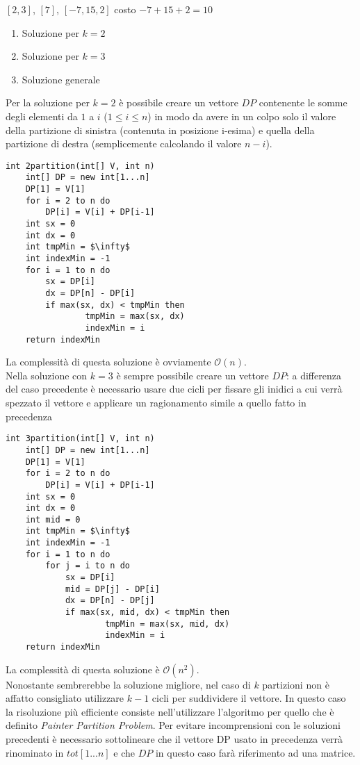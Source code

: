\documentclass[../cheatSheetAlgoritmi.tex]{subfiles}
\begin{document}
$[2,3]$, $[7]$, $[-7,15,2]$	costo $- 7 + 15 + 2 = 10$
\begin{enumerate}
	\item Soluzione per $k= 2$
	\item Soluzione per $k= 3$
	\item Soluzione generale
\end{enumerate}
Per la soluzione per $k = 2$ è possibile creare un vettore $DP$ contenente le somme degli elementi da $1$ a $i$ ($1 \leq i \leq n$) in modo da avere in un colpo solo il valore della partizione di sinistra (contenuta in posizione i-esima) e quella della partizione di destra (semplicemente calcolando il valore $n - i$).
\begin{lstlisting}[caption=2-partizioni]
int 2partition(int[] V, int n)
	int[] DP = new int[1...n]
	DP[1] = V[1]
	for i = 2 to n do
		DP[i] = V[i] + DP[i-1]
	int sx = 0
	int dx = 0
	int tmpMin = $\infty$
	int indexMin = -1
	for i = 1 to n do
		sx = DP[i]
		dx = DP[n] - DP[i]
		if max(sx, dx) < tmpMin then
				tmpMin = max(sx, dx)
				indexMin = i
	return indexMin
\end{lstlisting}
La complessità di questa soluzione è ovviamente $\mathcal{O}(n)$.\\
Nella soluzione con $k=3$ è sempre possibile creare un vettore $DP$: a differenza del caso precedente è necessario usare due cicli per fissare gli inidici a cui verrà spezzato il vettore e applicare un ragionamento simile a quello fatto in precedenza
\newpage
\begin{lstlisting}[caption=3-partizioni]
int 3partition(int[] V, int n)
	int[] DP = new int[1...n]
	DP[1] = V[1]
	for i = 2 to n do
		DP[i] = V[i] + DP[i-1]
	int sx = 0
	int dx = 0
	int mid = 0
	int tmpMin = $\infty$
	int indexMin = -1
	for i = 1 to n do
		for j = i to n do
			sx = DP[i]
			mid = DP[j] - DP[i]
			dx = DP[n] - DP[j]
			if max(sx, mid, dx) < tmpMin then
					tmpMin = max(sx, mid, dx)
					indexMin = i
	return indexMin
\end{lstlisting}
La complessità di questa soluzione è $\mathcal{O}(n^{2})$.\\
Nonostante sembrerebbe la soluzione migliore, nel caso di $k$ partizioni non è affatto consigliato utilizzare $k-1$ cicli per suddividere il vettore. In questo caso la risoluzione più efficiente consiste nell'utilizzare l'algoritmo per quello che è definito \emph{Painter Partition Problem}. Per evitare incomprensioni con le soluzioni precedenti è necessario sottolineare che il vettore DP usato in precedenza verrà rinominato in $tot[1...n]$ e che $DP$ in questo caso farà riferimento ad una matrice.\\
\end{document}
